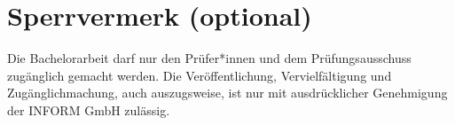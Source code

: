 \chapter*{Sperrvermerk (optional)}
\thispagestyle{empty}

{\sffamily\large

Die Bachelorarbeit darf nur den Prüfer*innen und dem Prüfungsausschuss zugänglich gemacht
werden. Die Veröffentlichung, Vervielfältigung und Zugänglichmachung, auch auszugsweise,
ist nur mit ausdrücklicher Genehmigung  der INFORM GmbH
zulässig.

}
\clearpage

